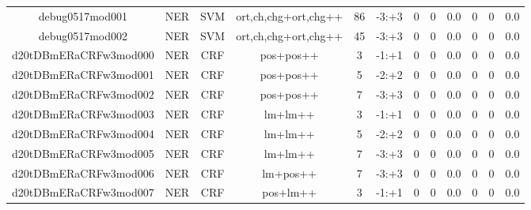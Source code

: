 \documentclass[a4paper]{article}
\begin{document}
\begin{landscape}
\begin{center}
\begin{tabular}{ |c|c|c|c|c|c|c|c|c|c|c|c|}
 
 	
 	\small{ debug0517mod001 } & \small{ NER} & \small{  SVM }  & ort,ch,chg+ort,chg++  &  86 &  \small{  -3:+3 }  &  0 & 0 & 0.0  &  0 & 0 & 0.0 \\
 	

 
 	
 	\small{ debug0517mod002 } & \small{ NER} & \small{  SVM }  & ort,ch,chg+ort,chg++  &  45 &  \small{  -3:+3 }  &  0 & 0 & 0.0  &  0 & 0 & 0.0 \\
 	

 
 	
 	\small{ d20tDBmERaCRFw3mod000 } & \small{ NER} & \small{  CRF }  & pos+pos++  &  3 &  \small{  -1:+1 }  &  0 & 0 & 0.0  &  0 & 0 & 0.0 \\
 	

 
 	
 	\small{ d20tDBmERaCRFw3mod001 } & \small{ NER} & \small{  CRF }  & pos+pos++  &  5 &  \small{  -2:+2 }  &  0 & 0 & 0.0  &  0 & 0 & 0.0 \\
 	

 
 	
 	\small{ d20tDBmERaCRFw3mod002 } & \small{ NER} & \small{  CRF }  & pos+pos++  &  7 &  \small{  -3:+3 }  &  0 & 0 & 0.0  &  0 & 0 & 0.0 \\
 	

 
 	
 	\small{ d20tDBmERaCRFw3mod003 } & \small{ NER} & \small{  CRF }  & lm+lm++  &  3 &  \small{  -1:+1 }  &  0 & 0 & 0.0  &  0 & 0 & 0.0 \\
 	

 
 	
 	\small{ d20tDBmERaCRFw3mod004 } & \small{ NER} & \small{  CRF }  & lm+lm++  &  5 &  \small{  -2:+2 }  &  0 & 0 & 0.0  &  0 & 0 & 0.0 \\
 	

 
 	
 	\small{ d20tDBmERaCRFw3mod005 } & \small{ NER} & \small{  CRF }  & lm+lm++  &  7 &  \small{  -3:+3 }  &  0 & 0 & 0.0  &  0 & 0 & 0.0 \\
 	

 
 	
 	\small{ d20tDBmERaCRFw3mod006 } & \small{ NER} & \small{  CRF }  & lm+pos++  &  7 &  \small{  -3:+3 }  &  0 & 0 & 0.0  &  0 & 0 & 0.0 \\
 	

 
 	
 	\small{ d20tDBmERaCRFw3mod007 } & \small{ NER} & \small{  CRF }  & pos+lm++  &  3 &  \small{  -1:+1 }  &  0 & 0 & 0.0  &  0 & 0 & 0.0 \\
 	


\end{tabular}
\end{center}
\end{landscape}
\end{document}
